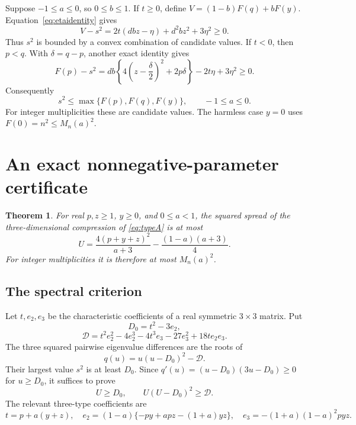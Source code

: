\documentclass[11pt]{article}
\newtheorem{theorem}{Theorem}
\begin{document}
Suppose $-1\le a\le0$, so $0\le b\le1$. If $t\ge0$, define
$V=(1-b)F(q)+bF(y)$. Equation~\eqref{eq:etaidentity} gives
\[
 V-s^2=2t(dbz-\eta)+d^2bz^2+3\eta^2\ge0.
\]
Thus $s^2$ is bounded by a convex combination of candidate values. If $t<0$,
then $p<q$. With $\delta=q-p$, another exact identity gives
\[
 F(p)-s^2=db\left\{4\left(z-\frac\delta2\right)^2+2p\delta\right\}
           -2t\eta+3\eta^2\ge0.
\]
Consequently
\begin{equation}\label{eq:negativebound}
 s^2\le\max\{F(p),F(q),F(y)\},\qquad -1\le a\le0.
\end{equation}
For integer multiplicities these are candidate values. The harmless case
$y=0$ uses $F(0)=n^2\le M_n(a)^2$.

\section{An exact nonnegative-parameter certificate}
\begin{theorem}\label{thm:typeA}
For real $p,z\ge1$, $y\ge0$, and $0\le a<1$, the squared spread of the
three-dimensional compression of \eqref{eq:typeA} is at most
\[
 U=\frac{4(p+y+z)^2}{a+3}-\frac{(1-a)(a+3)}4.
\]
For integer multiplicities it is therefore at most $M_n(a)^2$.
\end{theorem}

\subsection{The spectral criterion}
Let $t,e_2,e_3$ be the characteristic coefficients of a real symmetric
$3\times3$ matrix. Put
\[
 D_0=t^2-3e_2,
\]
\[
 \mathcal D=t^2e_2^2-4e_2^3-4t^3e_3-27e_3^2+18te_2e_3.
\]
The three squared pairwise eigenvalue differences are the roots of
\[
 q(u)=u(u-D_0)^2-\mathcal D.
\]
Their largest value $s^2$ is at least $D_0$. Since
$q'(u)=(u-D_0)(3u-D_0)\ge0$ for $u\ge D_0$, it suffices to prove
\begin{equation}\label{eq:criterion}
 U\ge D_0,\qquad U(U-D_0)^2\ge\mathcal D.
\end{equation}
The relevant three-type coefficients are
\[
 t=p+a(y+z),\quad
 e_2=(1-a)\{-py+apz-(1+a)yz\},\quad
 e_3=-(1+a)(1-a)^2pyz.
\]
\end{document}
